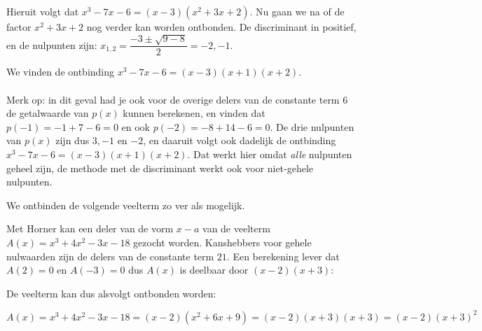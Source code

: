 \documentclass{ximera}
\begin{document}
\begin{example}
\begin{oplossing}[toon]
        Hieruit volgt dat $x^3-7x-6 = (x-3)(x^2+3x+2)$. Nu gaan we na of de factor  $x^2+3x+2$ nog verder kan worden ontbonden. De discriminant in positief, en de nulpunten zijn: $x_{1,2} = \dfrac{-3\pm\sqrt{9-8}}{2} = -2,-1$.
         
        We vinden de ontbinding $x^3-7x-6=(x-3)(x+1)(x+2)$.
        \\
        \\
        Merk op: in dit geval had je ook voor de overige delers van de constante term 6 de getalwaarde van $p(x)$ kunnen berekenen, en vinden dat $p(-1)=-1+7-6=0$ en ook $p(-2)=-8+14-6=0$. De drie nulpunten van $p(x)$ zijn dus $3,-1$ en $-2$, en daaruit volgt ook dadelijk de ontbinding $x^3-7x-6=(x-3)(x+1)(x+2)$. Dat werkt hier omdat \textit{alle} nulpunten geheel zijn, de methode met de discriminant werkt ook voor niet-gehele nulpunten.
         
    \end{oplossing}
\end{example}




\begin{example} 
We ontbinden de volgende veelterm zo ver als mogelijk.
\renewcommand{\kolbreed}{\widthof{$-18$}}

Met Horner kan een deler van de vorm \(x-a\) van de veelterm \(A(x) = x^3 + 4x^2 - 3x - 18\) gezocht worden. Kanshebbers voor gehele nulwaarden zijn de delers van de constante term $21$. Een berekening lever dat \( A(2) = 0 \text{ en } A(-3) = 0 \) dus $A(x)$ is deelbaar door $(x-2)(x+3)$: 



De veelterm kan dus alsvolgt ontbonden worden: 

\[
A(x) = x^3 + 4x^2 - 3x - 18= (x-2)(x^2+6x+9) = (x-2)(x+3)(x+3) = (x-2)(x+3)^2
\]

\end{example} 
\end{document}
